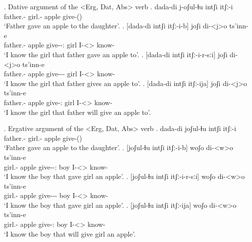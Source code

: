\ex. Dative argument of the <Erg, Dat, Abs> verb
	\ag. dada-di j-oʃul-ɬu intʃi itʃː-i\\
			{father.\Obl-\Erg} {girl.\Obl-\Dat} apple {give-\Pst(\Aor)}\\
			\glt `Father gave an apple to the daughter'.
	\bg. [dada-di intʃi itʃː-i-b] joʃi di-<j>o ts'inn-e\\
			{father.\Obl-\Erg} apple {give-\Pst-\Ptcp:\Pst} {girl} {I-<\F>\Aff} {know-\Hab} \\
			\glt `I know the girl that father gave an apple to'.
	\bg. [dada-di intʃi itʃː-i-r-sːi] joʃi di-<j>o ts'inn-e\\
			{father.\Obl-\Erg} apple {give-\Pst-\Prog-\Attr} {girl} {I-<\F>\Aff} {know-\Hab} \\
			\glt `I know the girl that father gives an apple to'.		
	\bg. [dada-di intʃi itʃː-ija] joʃi di-<j>o ts'inn-e\\
			{father.\Obl-\Erg} apple {give-\Ptcp:\Fut} {girl} {I-<\F>\Aff} {know-\Hab} \\
			\glt `I know the girl that father will give an apple to'.

\ex. Ergative argument of the <Erg, Dat, Abs> verb
	\ag. dada-di joʃul-ɬu intʃi itʃː-i\\
			{father.\Obl-\Erg} {girl.\Obl-\Dat} apple {give-\Pst(\Aor)}\\
			\glt `Father gave an apple to the daughter'.
	\bg. [joʃul-ɬu intʃi itʃː-i-b] woʃo di-<w>o ts'inn-e\\
			{girl.\Obl-\Dat} apple {give-\Pst-\Ptcp:\Pst} {boy} {I-<\M>\Aff} {know-\Hab} \\
			\glt `I know the boy that gave girl an apple'.
	\bg. [joʃul-ɬu intʃi itʃː-i-r-sːi] woʃo di-<w>o ts'inn-e\\
			{girl.\Obl-\Dat} apple {give-\Pst-\Prog-\Attr} {boy} {I-<\M>\Aff} {know-\Hab} \\
			\glt `I know the boy that gave girl an apple'.
	\bg. [joʃul-ɬu intʃi itʃː-ija] woʃo di-<w>o ts'inn-e\\
			{girl.\Obl-\Dat} apple {give-\Ptcp:\Fut} {boy} {I-<\M>\Aff} {know-\Hab} \\
			\glt `I know the boy that will give girl an apple'.


